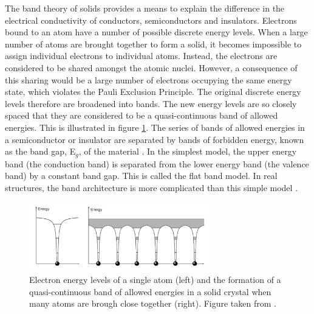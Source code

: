 The band theory of solids provides a means to explain the difference in the electrical conductivity of conductors, semiconductors and insulators. Electrons bound to an atom have a number of possible discrete energy levels. When a large number of atoms are brought together to form a solid, it becomes impossible to assign individual electrons to individual atoms. Instead, the electrons are considered to be shared amongst the atomic nuclei. However, a consequence of this sharing would be a large number of electrons occupying the same energy state, which violates the Pauli Exclusion Principle. The original discrete energy levels therefore are broadened into bands. The new energy levels are so closely spaced that they are considered to be a quasi-continuous band of allowed energies. This is illustrated in figure \ref{band_Elevels}. The series of bands of allowed energies in a semiconductor or insulator are separated by bands of forbidden energy, known as the band gap, E$_g$, of the material \cite{dielectric1}. In the simplest model, the upper energy band (the conduction band) is separated from the lower energy band (the valence band) by a constant band gap. This is called the flat band model. In real structures, the band architecture is more complicated than this simple model \cite{Tilley}.\\

\begin{figure}[h!]
  \centering
    \includegraphics[width=0.7\textwidth]{figures/band_Elevels.png}
    \caption{Electron energy levels of a single atom (left) and the formation of a quasi-continuous band of allowed energies in a solid crystal when many atoms are brough close together (right). Figure taken from .}
  \label{band_Elevels}
\end{figure}

